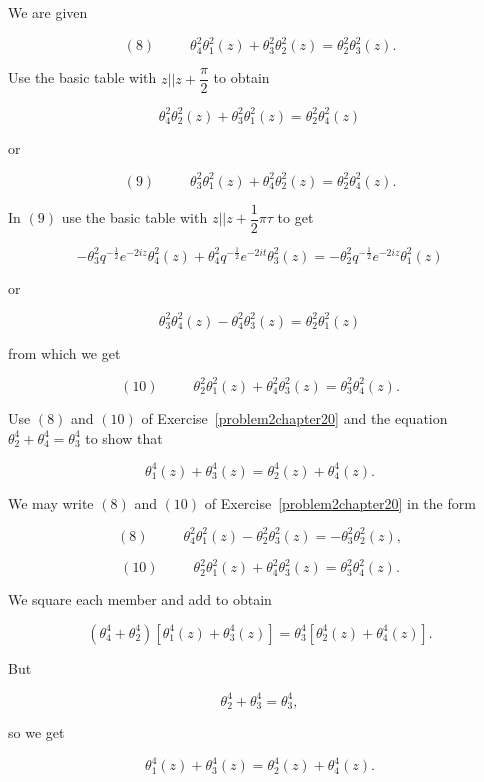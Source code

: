 \begin{solution}
We are given

$$(8) \hspace{30pt} \theta_4^2\theta_1^2(z) + \theta_3^2 \theta_2^2(z) = \theta_2^2\theta_3^2(z).$$

Use the basic table with $z || z + \dfrac{\pi}{2}$ to obtain

$$\theta_4^2 \theta_2^2(z) + \theta_3^2 \theta_1^2(z) = \theta_2^2 \theta_4^2(z)$$

or

$$(9) \hspace{30pt} \theta_3^2 \theta_1^2(z) + \theta_4^2\theta_2^2(z) = \theta_2^2\theta_4^2(z).$$

In $(9)$ use the basic table with $z || z + \dfrac{1}{2} \pi \tau$ to get

$$-\theta_3^2 q^{-\frac{1}{2}} e^{-2iz} \theta_4^2(z) + \theta_4^2 q^{-\frac{1}{2}} e^{-2it} \theta_3^2(z) = -\theta_2^2 q^{-\frac{1}{2}} e^{-2iz} \theta_1^2(z)$$

or

$$\theta_3^2 \theta_4^2(z) - \theta_4^2\theta_3^2(z) = \theta_2^2 \theta_1^2(z)$$

from which we get

$$(10) \hspace{30pt} \theta_2^2 \theta_1^2(z) + \theta_4^2 \theta_3^2(z) = \theta_3^2 \theta_4^2(z).$$
\end{solution}
\begin{problem}\label{problem3chapter20}
Use $(8)$ and $(10)$ of Exercise~\ref{problem2chapter20} and the equation $\theta_2^4+\theta_4^4=\theta_3^4$ to show that

$$\theta_1^4(z) + \theta_3^4(z)=\theta_2^4(z)+\theta_4^4(z).$$
\end{problem}
\begin{solution}
We may write $(8)$ and $(10)$ of Exercise~\ref{problem2chapter20} in the form

$$(8) \hspace{30pt} \theta_4^2 \theta_1^2(z) - \theta_2^2 \theta_3^2(z) = -\theta_3^2 \theta_2^2(z),$$

$$(10) \hspace{30pt} \theta_2^2 \theta_1^2(z) + \theta_4^2 \theta_3^2(z) = \theta_3^2 \theta_4^2(z).$$

We square each member and add to obtain

$$(\theta_4^4 + \theta_2^4) [\theta_1^4(z) + \theta_3^4(z)] = \theta_3^4[\theta_2^4(z) + \theta_4^4(z)].$$

But

$$\theta_2^4 + \theta_3^4 = \theta_3^4,$$

so we get

$$\theta_1^4(z) + \theta_3^4(z) = \theta_2^4(z) + \theta_4^4(z).$$
\end{solution}
